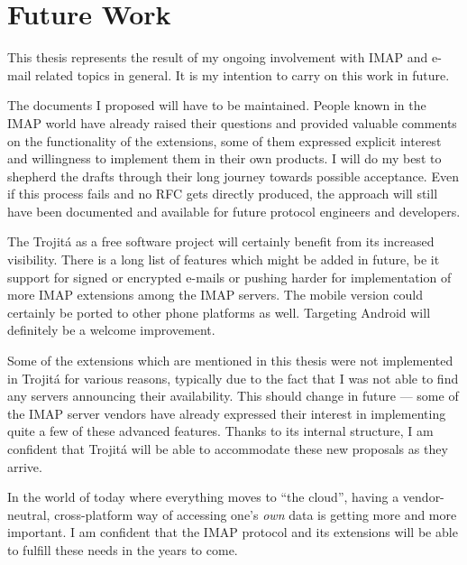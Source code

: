 \documentclass[trojita]{subfiles}
\begin{document}
\section{Future Work}
\label{sec:future-work}

This thesis represents the result of my ongoing involvement with IMAP and e-mail related topics in general.  It is my
intention to carry on this work in future.

The documents I proposed will have to be maintained.  People known in the IMAP world have already raised their questions
and provided valuable comments on the functionality of the extensions, some of them expressed explicit interest and
willingness to implement them in their own products.  I will do my best to shepherd the drafts through their long
journey towards possible acceptance.  Even if this process fails and no RFC gets directly produced, the approach will
still have been documented and available for future protocol engineers and developers.

The Trojitá as a free software project will certainly benefit from its increased visibility.  There is a long list of
features which might be added in future, be it support for signed or encrypted e-mails or pushing harder for
implementation of more IMAP extensions among the IMAP servers.  The mobile version could certainly be ported to other
phone platforms as well.  Targeting Android will definitely be a welcome improvement.

Some of the extensions which are mentioned in this thesis were not implemented in Trojitá for various reasons, typically
due to the fact that I was not able to find any servers announcing their availability.  This should change in future ---
some of the IMAP server vendors have already expressed their interest in implementing quite a few of these advanced
features.  Thanks to its internal structure, I am confident that Trojitá will be able to accommodate these new proposals
as they arrive.

\enlargethispage{\baselineskip}
In the world of today where everything moves to ``the cloud'', having a vendor-neutral, cross-platform way of accessing
one's {\em own} data is getting more and more important.  I am confident that the IMAP protocol and its extensions will
be able to fulfill these needs in the years to come.
\end{document}
